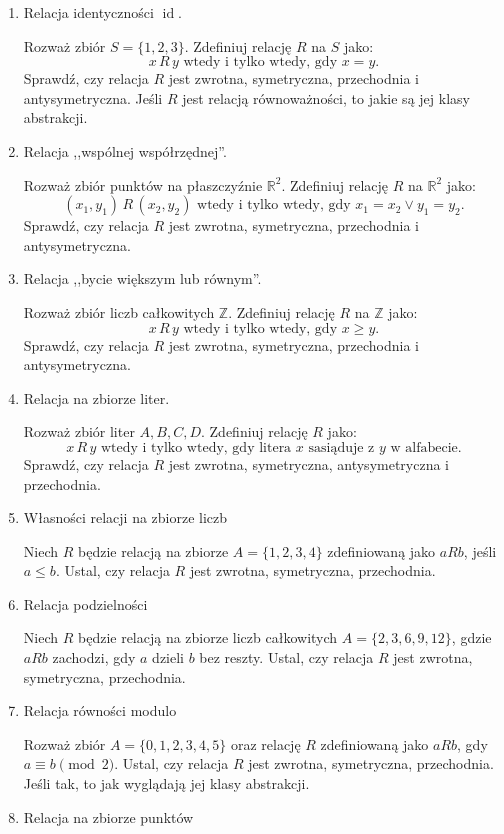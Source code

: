 \documentclass[12pt]{article}
\DeclareMathOperator{\id}{id}
\begin{document}
\begin{enumerate}
\item 
Relacja identyczności $\id$.

Rozważ zbiór $ S = \{1, 2, 3\} $. Zdefiniuj relację $ R $ na $ S $ jako:
\[
x \, R \, y \text{ wtedy i tylko wtedy, gdy } x = y.
\]
Sprawdź, czy relacja $ R $ jest zwrotna, symetryczna, przechodnia i antysymetryczna.
Jeśli $R$ jest relacją równoważności, to jakie są jej klasy abstrakcji.



\item 
Relacja ,,wspólnej współrzędnej''.

Rozważ zbiór punktów na płaszczyźnie $ \mathbb{R}^2 $. Zdefiniuj relację $ R $ na $ \mathbb{R}^2 $ jako:
\[
(x_1, y_1) \, R \, (x_2, y_2) \text{ wtedy i tylko wtedy, gdy } x_1 = x_2 \lor  y_1 = y_2.
\]
Sprawdź, czy relacja $ R $ jest zwrotna, symetryczna, przechodnia i antysymetryczna.

\item 
Relacja ,,bycie większym lub równym''.

Rozważ zbiór liczb całkowitych $ \mathbb{Z} $. Zdefiniuj relację $ R $ na $ \mathbb{Z} $ jako:
\[
x \, R \, y \text{ wtedy i tylko wtedy, gdy } x \geq y.
\]
Sprawdź, czy relacja $ R $ jest zwrotna, symetryczna, przechodnia i antysymetryczna.

\item 
Relacja na zbiorze liter.

Rozważ zbiór liter $ A, B, C, D $. Zdefiniuj relację $ R $ jako:
\[
x \, R \, y \text{ wtedy i tylko wtedy, gdy litera } x \text{ sasiąduje z } y \text{ w alfabecie.}
\]
Sprawdź, czy relacja $ R $ jest zwrotna, symetryczna, antysymetryczna i przechodnia.

\item 
Własności relacji na zbiorze liczb  

Niech $ R $ będzie relacją na zbiorze $ A = \{1, 2, 3, 4\} $ zdefiniowaną jako $ a R b $, jeśli $ a \leq b $.  
Ustal, czy relacja $ R $ jest zwrotna, symetryczna, przechodnia.

\item 
Relacja podzielności  

Niech $ R $ będzie relacją na zbiorze liczb całkowitych $ A = \{2, 3, 6, 9, 12\} $, gdzie $ a R b $ zachodzi, gdy $ a $ dzieli $ b $ bez reszty.  
Ustal, czy relacja $ R $ jest zwrotna, symetryczna, przechodnia.

\item 
Relacja równości modulo  

Rozważ zbiór $ A = \{0, 1, 2, 3, 4, 5\} $ oraz relację $ R $ zdefiniowaną jako $ a R b $, gdy $ a \equiv b \pmod{2} $.  
Ustal, czy relacja $ R $ jest zwrotna, symetryczna, przechodnia.
Jeśli tak, to jak wyglądają jej klasy abstrakcji.
\item 
Relacja na zbiorze punktów  


\end{enumerate}
\end{document}
